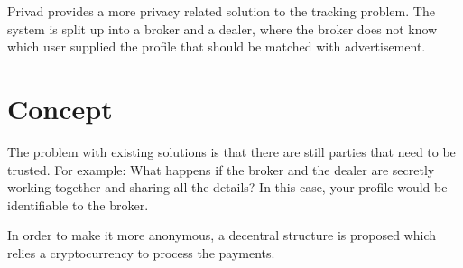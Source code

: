 \documentclass[]{article}
\begin{document}
Privad provides a more privacy related solution to the tracking problem. The system is split up into a broker and a dealer, where the broker does not know which user supplied the profile that should be matched with advertisement. 

\section {Concept}

The problem with existing solutions is that there are still parties that need to be trusted. For example: What happens if the broker and the dealer are secretly working together and sharing all the details? In this case, your profile would be identifiable to the broker.

In order to make it more anonymous, a decentral structure is proposed which relies a cryptocurrency to process the payments. 
\end{document}
